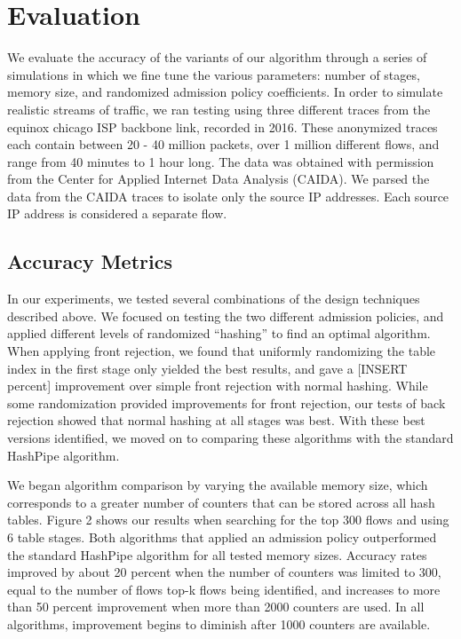 \section{Evaluation}
\label{sec:eval}

We evaluate the accuracy of the variants of our algorithm through a series of simulations in which we fine tune the various parameters: number of stages, memory size, and randomized admission policy coefficients. In order to simulate realistic streams of traffic, we ran testing using three different traces from the equinox chicago ISP backbone link, recorded in 2016. These anonymized traces each contain between 20 - 40 million packets, over 1 million different flows, and range from 40 minutes to 1 hour long. The data was obtained with permission from the Center for Applied Internet Data Analysis (CAIDA). We parsed the data from the CAIDA traces to isolate only the source IP addresses. Each source IP address is considered a separate flow.

\subsection{Accuracy Metrics}
In our experiments, we tested several combinations of the design techniques described above. We focused on testing the two different admission policies, and applied different levels of randomized ``hashing'' to find an optimal algorithm. When applying front rejection, we found that uniformly randomizing the table index in the first stage only yielded the best results, and gave a [INSERT percent] improvement over simple front rejection with normal hashing. While some randomization provided improvements for front rejection, our tests of back rejection showed that normal hashing at all stages was best. With these best versions identified, we moved on to comparing these algorithms with the standard HashPipe algorithm.

We began algorithm comparison by varying the available memory size, which corresponds to a greater number of counters that can be stored across all hash tables. Figure 2 shows our results when searching for the top 300 flows and using 6 table stages. Both algorithms that applied an admission policy outperformed the standard HashPipe algorithm for all tested memory sizes. Accuracy rates improved by about 20 percent when the number of counters was limited to 300, equal to the number of flows top-k flows being identified, and increases to more than 50 percent improvement when more than 2000 counters are used. In all algorithms, improvement begins to diminish after 1000 counters are available.


